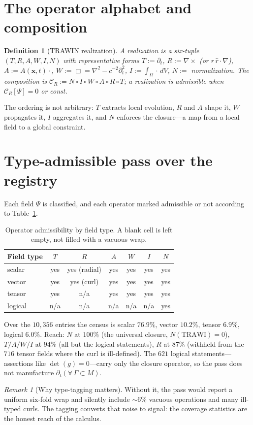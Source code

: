\documentclass[11pt]{article}
\newtheorem{definition}[theorem]{Definition}
\theoremstyle{remark}
\newtheorem{remark}[theorem]{Remark}
\begin{document}
\section{The operator alphabet and composition}
\begin{definition}[TRAWIN realization]
A realization is a six-tuple $(T,R,A,W,I,N)$ with representative forms $T := \partial_t$, $R := \nabla\times$ (or $r\,\hat r\cdot\nabla$), $A := A(\mathbf{x},t)\cdot$, $W := \Box = \nabla^2 - c^{-2}\partial_t^2$, $I := \int_\Omega \cdot\,dV$, $N := $ normalization. The composition is $\mathcal{C}_R := N \circ I \circ W \circ A \circ R \circ T$; a realization is admissible when $\mathcal{C}_R[\Psi] = 0$ or const.
\end{definition}
The ordering is not arbitrary: $T$ extracts local evolution, $R$ and $A$ shape it, $W$ propagates it, $I$ aggregates it, and $N$ enforces the closure---a map from a local field to a global constraint.
\section{Type-admissible pass over the registry}
Each field $\Psi$ is classified, and each operator marked admissible or not according to Table~\ref{tab:admiss}.
\begin{table}[ht]\centering
\caption{Operator admissibility by field type. A blank cell is left empty, not filled with a vacuous wrap.}
\label{tab:admiss}
\begin{tabular}{lcccccc}
\toprule
Field type & $T$ & $R$ & $A$ & $W$ & $I$ & $N$ \\
\midrule
scalar & yes & yes (radial) & yes & yes & yes & yes \\
vector & yes & yes (curl) & yes & yes & yes & yes \\
tensor & yes & n/a & yes & yes & yes & yes \\
logical & n/a & n/a & n/a & n/a & n/a & yes \\
\bottomrule
\end{tabular}
\end{table}
Over the $10{,}356$ entries the census is scalar $76.9\%$, vector $10.2\%$, tensor $6.9\%$, logical $6.0\%$. Reach: $N$ at $100\%$ (the universal closure, $N(\mathrm{TRAWI}) = 0$), $T/A/W/I$ at $94\%$ (all but the logical statements), $R$ at $87\%$ (withheld from the $716$ tensor fields where the curl is ill-defined). The $621$ logical statements---assertions like $\det(g) = 0$---carry only the closure operator, so the pass does not manufacture $\partial_t(\forall\,\Gamma \subset M)$.
\begin{remark}[Why type-tagging matters]
Without it, the pass would report a uniform six-fold wrap and silently include $\sim 6\%$ vacuous operations and many ill-typed curls. The tagging converts that noise to signal: the coverage statistics are the honest reach of the calculus.
\end{remark}
\end{document}

